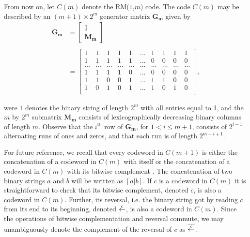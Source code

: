From now on, let $C(m)$ denote the RM($1$,$m$) code. The code
$C(m)$ may be described by an $(m+1) \times 2^m$ generator matrix
$\mathbf{G_m}$ given by
\begin{equation*}\label{eq:g}
 \begin{array}{lll} \mathbf{G_m} &=
\left[ \begin{array}{c} \underline{1} \\ \mathbf{M_m} \end{array} \right] \\
{} & {}\\
{} &=\left[ \begin{array}{cccccccccc}
1 & 1 & 1 & 1 & 1 & \ldots & 1 & 1 & 1 & 1 \\
1 & 1 & 1 & 1 & 1 & \ldots & 0 & 0 & 0 & 0 \\
\ldots & \ldots & \ldots & \ldots &\ldots &\ldots & \ldots & \ldots & \ldots &\ldots\\
1 & 1 & 1 & 1 & 0 & \ldots & 0 & 0 & 0 & 0 \\
1 & 1 & 0 & 0 & 1 & \ldots & 1 & 1 & 0 & 0 \\
1 & 0 & 1 & 0 & 1 & \ldots & 1 & 0 & 1 & 0\\
\end{array}\right],
\end{array}
\end{equation*}

\noindent were $\underline{1}$ denotes the binary string of length
$2^m$ with all entries equal to 1, and the $m$ by $2^m$ submatrix
$\mathbf{M_m}$ consists of lexicographically decreasing binary
columns of length $m$. Observe that the $i^{\text{th}}$ row of
$\mathbf{G_m}$, for $1 <i \leq m+1$, consists of $2^{i-1}$
alternating runs of ones and zeros, and that each run is of length
$2^{m-i+1}$.

 For future
reference, we recall that every codeword in $C(m+1)$ is either the
concatenation of a codeword in $C(m)$ with itself or the
concatenation of a codeword in $C(m)$ with its bitwise complement
\cite[Thm. 2, pg. 374]{mws:77}. The concatenation of two binary
strings $a$ and $b$ will be written as $[a | b]$. If $c$ is a
codeword in $C(m)$ it is straightforward to check that its bitwise
complement, denoted $\overline{c}$, is also a codeword in $C(m)$.
Further, its reversal, i.e. the binary string got by reading $c$
from its end to its beginning, denoted ${{\stackrel{c}{\leftarrow}}}$, is also a codeword
in $C(m)$. Since the operations of bitwise complementation and
reversal commute, we may unambiguously denote the complement of
the reversal of $c$ as $\overline{{{\stackrel{c}{\leftarrow}}}}$.

